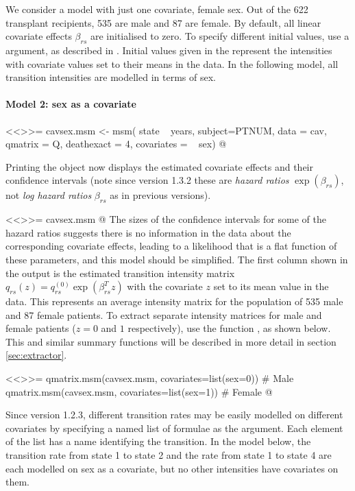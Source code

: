 We consider a model with just one covariate, female sex.  Out of the
622 transplant recipients, 535 are male and 87 are female.  By
default, all linear covariate effects $\beta_{rs}$ are initialised to
zero. To specify different initial values, use a 
argument, as described in .  Initial values given
in the  represent the intensities with covariate values
set to their means in the data.  In the following model, all transition
intensities are modelled in terms of sex.

\paragraph{Model 2: sex as a covariate}
<<>>=
cavsex.msm <- msm( state ~ years, subject=PTNUM, data = cav,
                     qmatrix = Q, deathexact = 4, covariates = ~ sex)
@

Printing the  object now displays the estimated covariate
effects and their confidence intervals (note since version 1.3.2 these
are \emph{hazard ratios} $\exp(\beta_{rs})$, not \emph{log hazard ratios} $\beta_{rs}$ as in previous
versions).

<<>>=
cavsex.msm
@
The sizes of the
confidence intervals for some of the hazard ratios suggests there is no information in the data about 
the corresponding covariate effects, leading to a likelihood that is a flat function of these parameters, 
and this model should be simplified. The first column shown in the output
is the estimated transition intensity matrix
$q_{rs}(z) = q_{rs}^{(0)} \exp(\beta_{rs}^T z)$ with the covariate $z$
set to its mean value in the data.  This represents an average
intensity matrix for the population of 535 male and 87 female
patients. To extract separate intensity matrices for male and female
patients ($z = 0$ and $1$ respectively), use the function
, as shown below.  This and similar summary
functions will be described in more detail in
section \ref{sec:extractor}.

<<>>=
qmatrix.msm(cavsex.msm, covariates=list(sex=0)) # Male
qmatrix.msm(cavsex.msm, covariates=list(sex=1)) # Female
@

Since  version 1.2.3, different transition rates may be
easily modelled on different covariates by specifying a named list of
formulae as the  argument.  Each element of the
list has a name identifying the transition.  In the model below, the
transition rate from state 1 to state 2 and the rate from state 1 to
state 4 are each modelled on sex as a covariate, but no other
intensities have covariates on them.


